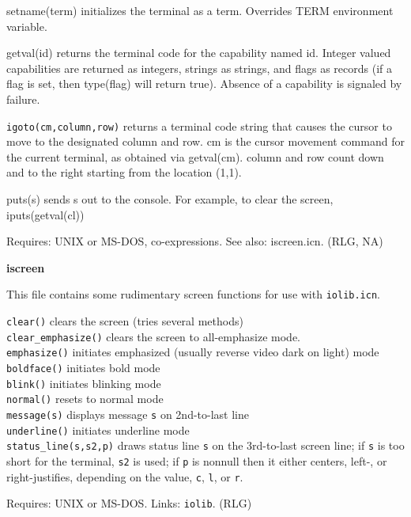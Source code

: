 \textsf{setname(term)} initializes the terminal as a term. Overrides
TERM environment variable.

\textsf{getval(id)} returns the terminal code for the capability named
id. Integer valued capabilities are returned as integers, strings as
strings, and flags as records (if a flag is set, then
\textsf{type(flag)} will return
\textsf{{\textquotedbl}true{\textquotedbl}}). Absence of a capability
is signaled by failure.

\texttt{igoto(cm,column,row)} returns a terminal code string that causes
the cursor to move to the designated column and row. cm is the cursor
movement command for the current terminal, as obtained via
getval({\textquotedbl}cm{\textquotedbl}). column and row count down and
to the right starting from the location (1,1).

\textsf{puts(s)} sends s out to the console. For example, to clear the
screen, \textsf{iputs(getval({\textquotedbl}cl{\textquotedbl}))}

Requires: UNIX or MS-DOS, co-expressions. See also: iscreen.icn. (RLG,
NA)

{\sffamily\bfseries
iscreen}

This file contains some rudimentary screen functions for use with
\texttt{iolib.icn}.

\texttt{clear()} clears the screen (tries several methods)\\
\texttt{clear\_emphasize()} clears the screen to all-emphasize
mode.\\
\texttt{emphasize()} initiates emphasized (usually reverse video dark on
light) mode\\
\texttt{boldface()} initiates bold mode\\
\texttt{blink()} initiates blinking mode\\
\texttt{normal()} resets to normal mode\\
\texttt{message(s)} displays message \texttt{s} on 2nd-to-last
line\\
\texttt{underline()} initiates underline mode\\
\texttt{status\_line(s,s2,p)} draws status line \texttt{s} on the
3rd-to-last screen line; if \texttt{s} is too short for the terminal,
\texttt{s2} is used; if \texttt{p} is nonnull then it either centers,
left-, or right-justifies, depending on the value,
\texttt{{\textquotedbl}c{\textquotedbl}},
\texttt{{\textquotedbl}l{\textquotedbl}}, or
\texttt{{\textquotedbl}r{\textquotedbl}}.

Requires: UNIX or MS-DOS. Links: \texttt{iolib}. (RLG)

